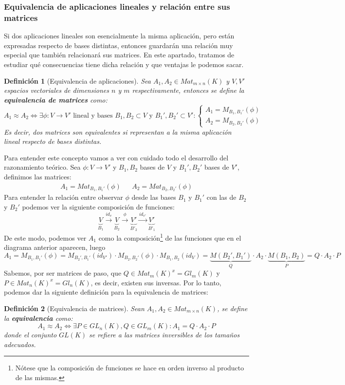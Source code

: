 \documentclass[10pt,a4paper,openright]{book}
\theoremstyle{break}
\newtheorem*{defi}{Definición}
\begin{document}
\subsubsection{Equivalencia de aplicaciones lineales y relación entre sus matrices}
Si dos aplicaciones lineales son esencialmente la misma aplicación, pero están expresadas respecto de bases distintas, entonces guardarán una relación muy especial que también relacionará sus matrices. En este apartado, tratamos de estudiar qué consecuencias tiene dicha relación y que ventajas le podemos sacar.

\begin{defi}[Equivalencia de aplicaciones]
Sea $A_1, A_2\in Mat_{m\times n}(K)$ y $V, V'$ espacios vectoriales de dimensiones $n$ y $m$ respectivamente, entonces se define la \textbf{equivalencia de matrices} como:
$$A_1\approx A_2 \Leftrightarrow \exists \phi: V\rightarrow V'\mbox{ lineal y bases } B_1,B_2\subset V \mbox{ y } B_1', B_2'\subset V': \begin{cases}
A_1=M_{B_1,B_1'}(\phi) \\ A_2=M_{B_2,B_2'}(\phi)
\end{cases}$$
Es decir, dos matrices son equivalentes si representan a la misma aplicación lineal respecto de bases distintas.
\end{defi}

Para entender este concepto vamos a ver con cuidado todo el desarrollo del razonamiento teórico. Sea $\phi: V\longrightarrow V'$ y $B_1, B_2$ bases de $V$ y $B_1', B_2'$ bases de $V'$, definimos las matrices:
\begin{align*}
A_1=Mat_{B_1,B_1'}(\phi) & & A_2=Mat_{B_2,B_2'}{}(\phi)
\end{align*}
Para entender la relación entre observar $\phi$ desde las bases $B_1$ y $B_1'$ con las de $B_2$ y $B_2'$ podemos ver la siguiente composición de funciones:
$$\underbrace{V}_{B_1}\xrightarrow{id_v} \underbrace{V}_{B_2} \xrightarrow{\phi} \underbrace{V'}_{B'_2} \xrightarrow{id_{v'}} \underbrace{V'}_{B'_1}$$
De este modo, podemos ver $A_1$ como la composición\footnote{Nótese que la composición de funciones se hace en orden inverso al producto de las mismas.} de las funciones que en el diagrama anterior aparecen, luego
$$A_1=M_{B_1,B_1'}(\phi)=M_{B_2',B_1'}(id_{V'})\cdot M_{B_2,B_2'}(\phi)\cdot M_{B_1, B_2}(id_V)=\underbrace{M(B_2',B_1')}_{Q}\cdot A_2\cdot \underbrace{M(B_1,B_2)}_{P}=Q\cdot A_2\cdot P$$
Sabemos, por ser matrices de paso, que $Q\in Mat_m(K)^x=Gl_m(K)$ y $P\in Mat_n(K)^x=Gl_n(K)$, es decir, existen sus inversas. Por lo tanto, podemos dar la siguiente definición para la equivalencia de matrices:
\begin{defi}[Equivalencia de matrices]
Sean $A_1, A_2\in Mat_{m\times n}(K)$, se define la \textbf{equivalencia} como:
$$A_1\approx A_2 \Leftrightarrow \exists P\in GL_n(K), Q\in GL_m(K) :  A_1=Q\cdot A_2\cdot P$$
donde el conjunto $GL(K)$ se refiere a las matrices inversibles de los tamaños adecuados.
\end{defi}
\end{document}
